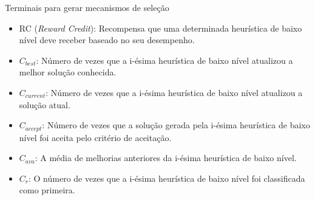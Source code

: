 \begin{frame}{Terminais para gerar mecanismos de seleção}
	

		\begin{itemize}
			\item RC (\textit{Reward Credit}): Recompensa que uma determinada heurística de baixo nível deve receber baseado no seu desempenho.
			\item \textbf{$C_{best}$}: Número de vezes que a i-ésima heurística de baixo nível atualizou a melhor solução conhecida. %
			\item $C_{current}$: Número de vezes que a i-ésima heurística de baixo nível atualizou a solução atual. %
			\item $C_{accept}$: Número de vezes que a solução gerada pela i-ésima heurística de baixo nível foi aceita pelo critério de aceitação. %
			\item $C_{ava}$: A média de melhorias anteriores da i-ésima heurística de baixo nível. %
			\item $C_r$: O número de vezes que a i-ésima heurística de baixo nível foi classificada como primeira.
		  
		\end{itemize} 
\end{frame}	
		

